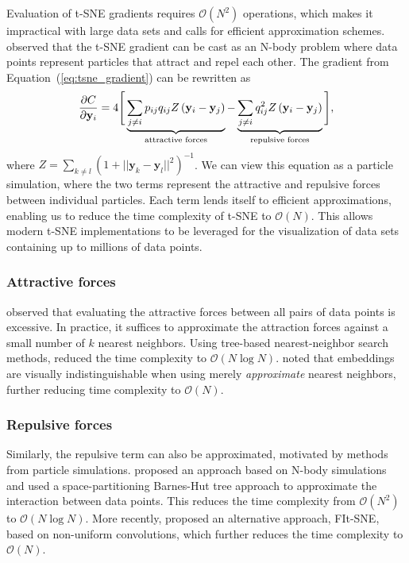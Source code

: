 \documentclass[article]{jss}
\begin{document}
Evaluation of t-SNE gradients requires $\mathcal{O}(N^2)$ operations,
which makes it impractical with large data sets and
calls for efficient approximation schemes.
\citet{van2014accelerating} observed that the t-SNE gradient can be cast as an
N-body problem where data points represent particles that attract and repel each
other. The gradient from Equation~(\ref{eq:tsne_gradient}) can be rewritten as
\begin{equation}
\frac{\partial C}{\partial \mathbf{y}_i} = 4 \Bigg [
\underbrace{\sum_{j \neq i} p_{ij} q_{ij} Z \left ( \mathbf{y}_i - \mathbf{y}_j \right )}_{\text{attractive forces}}  -
\underbrace{\sum_{j \neq i} q_{ij}^2 Z \left ( \mathbf{y}_i - \mathbf{y}_j \right )}_{\text{repulsive forces}}
\Bigg ], \label{eq:grad_attr_rep} \notag
\end{equation}
where $Z = \sum_{k \neq l}\left ( 1 + || \mathbf{y}_k - \mathbf{y}_l ||^2 \right
)^{-1}$. We can view this equation as a particle simulation, where the
two terms represent the attractive and repulsive forces between individual
particles. Each term lends itself to efficient approximations, enabling us to
reduce the time complexity of t-SNE to $\mathcal{O}(N)$. This allows modern
t-SNE implementations to be leveraged for the visualization of data sets
containing up to millions of data points.

\subsubsection*{Attractive forces}
\citet{van2014accelerating} observed that evaluating the attractive forces
between all pairs of data points is excessive. In practice, it 
suffices to approximate the attraction forces against a small number of
$k$ nearest neighbors. Using tree-based nearest-neighbor search methods,
\citet{van2014accelerating} reduced the time complexity to $\mathcal{O}(N \log
N)$. \citet{linderman2019fast} noted that embeddings
are visually indistinguishable when using merely \textit{approximate} nearest
neighbors, further reducing time complexity to $\mathcal{O}(N)$.

\subsubsection*{Repulsive forces}
Similarly, the repulsive term can also be approximated, motivated by methods from
particle simulations. \citet{van2014accelerating} proposed an approach based on
N-body simulations and used a space-partitioning Barnes-Hut tree approach to
approximate the interaction between data points. This reduces the time
complexity from $\mathcal{O}(N^2)$ to $\mathcal{O}(N \log N)$. More recently,
\citet{linderman2019fast} proposed an alternative approach, FIt-SNE, based on
non-uniform convolutions, which further reduces the time complexity to
$\mathcal{O}(N)$.
\end{document}
